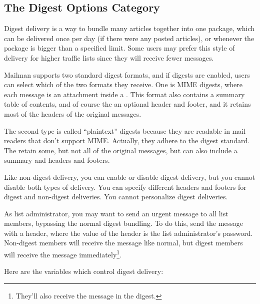 \documentclass{howto}
\begin{document}
\subsection{The Digest Options Category}

Digest delivery is a way to bundle many articles together into one
package, which can be delivered once per day (if there were any posted
articles), or whenever the package is bigger than a specified limit.
Some users may prefer this style of delivery for higher traffic lists
since they will receive fewer messages.

Mailman supports two standard digest formats, and if digests are
enabled, users can select which of the two formats they receive.  One
is MIME digests, where each message is an attachment inside a
.  This format also contains a summary
table of contents, and of course the an optional header and footer,
and it retains most of the headers of the original messages.

The second type is called ``plaintext'' digests because they are
readable in mail readers that don't support MIME.  Actually, they
adhere to the  digest standard.  The retain some, but not
all of the original messages, but can also include a summary and
headers and footers.

Like non-digest delivery, you can enable or disable digest delivery,
but you cannot disable both types of delivery.  You can specify
different headers and footers for digest and non-digest deliveries.
You cannot personalize digest deliveries.

As list administrator, you may want to send an urgent message to all
list members, bypassing the normal digest bundling.  To do this, send
the message with a  header, where the value of the
header is the list administrator's password.  Non-digest members will
receive the message like normal, but digest members will receive the
message immediately\footnote{They'll also receive the message in the
digest.}.

Here are the variables which control digest delivery:
\end{document}
